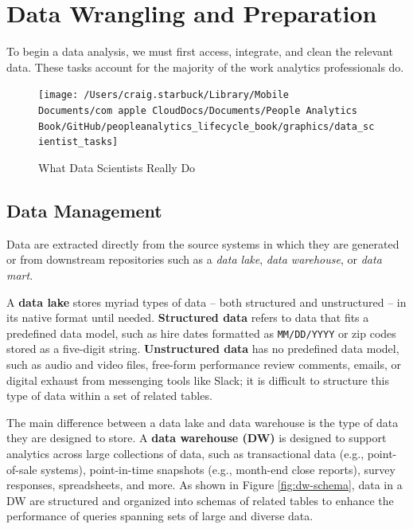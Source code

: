\documentclass[]{book}
\begin{document}
\hypertarget{data-wrang-prep}{%
\chapter{Data Wrangling and Preparation}\label{data-wrang-prep}}

To begin a data analysis, we must first access, integrate, and clean the relevant data. These tasks account for the majority of the work analytics professionals do.

\begin{figure}

{\centering \texttt{[image: /Users/craig.starbuck/Library/Mobile Documents/com~apple~CloudDocs/Documents/People Analytics Book/GitHub/peopleanalytics\_lifecycle\_book/graphics/data\_scientist\_tasks]} 

}

\caption{What Data Scientists Really Do}\label{fig:ds-tasks}
\end{figure}

\hypertarget{data-management}{%
\section{Data Management}\label{data-management}}

Data are extracted directly from the source systems in which they are generated or from downstream repositories such as a \emph{data lake}, \emph{data warehouse}, or \emph{data mart}.

A \textbf{data lake} stores myriad types of data -- both structured and unstructured -- in its native format until needed. \textbf{Structured data} refers to data that fits a predefined data model, such as hire dates formatted as \texttt{MM/DD/YYYY} or zip codes stored as a five-digit string. \textbf{Unstructured data} has no predefined data model, such as audio and video files, free-form performance review comments, emails, or digital exhaust from messenging tools like Slack; it is difficult to structure this type of data within a set of related tables.

The main difference between a data lake and data warehouse is the type of data they are designed to store. A \textbf{data warehouse (DW)} is designed to support analytics across large collections of data, such as transactional data (e.g., point-of-sale systems), point-in-time snapshots (e.g., month-end close reports), survey responses, spreadsheets, and more. As shown in Figure \ref{fig:dw-schema}, data in a DW are structured and organized into schemas of related tables to enhance the performance of queries spanning sets of large and diverse data.
\end{document}
